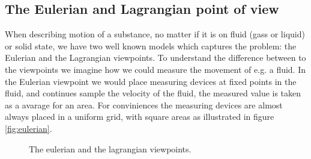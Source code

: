 
\subsection{The Eulerian and Lagrangian point of view}

When describing motion of a substance, no matter if it is on fluid
(gass or liquid) or solid state, we have two well known models which
captures the problem: the Eulerian and the Lagrangian viewpoints. To
understand the difference between to the viewpoints we imagine how we
could measure the movement of e.g. a fluid. In the Eulerian viewpoint
we would place measuring devices at fixed points in the fluid, and
continues sample the velocity of the fluid, the measured value is
taken as a avarage for an area. For conviniences the measuring devices
are almost always placed in a uniform grid, with square areas as
illustrated in figure \ref{fig:eulerian}.

\begin{figure}[h]
  \centering
  \caption{The eulerian and the lagrangian viewpoints.}
  \label{fig:eulerian-lagrangian}
\end{figure}

